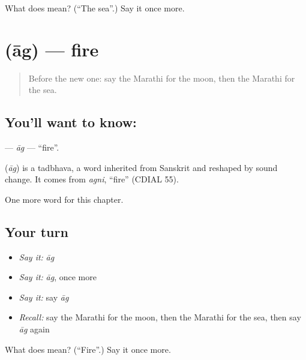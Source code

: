 \begin{tcolorbox}[breakable,colback=teal!4,colframe=teal!35!black,title={Before you move on}]
What does  mean? (\textquotedblleft{}The sea\textquotedblright{}.) Say it once more.
\end{tcolorbox}
\section[\texorpdfstring{\mr{आग} (āg)}{आग (āg)}]{ (āg) — fire}

\label{lesson:MR-C98-ag}



\begin{quote}
Before the new one: say the Marathi for the moon, then the Marathi for the sea.
\end{quote}

\subsection*{You'll want to know: }
\textbf{} — \emph{āg} — \textquotedblleft{}fire\textquotedblright{}.

\begin{cousinweb}
\textbf{} (\emph{āg}) is a tadbhava, a word inherited from Sanskrit and reshaped by sound change. It comes from \emph{agni}, \textquotedblleft{}fire\textquotedblright{} (CDIAL 55).
\end{cousinweb}

\begin{grammarlens}[title={What you've built}]
One more word for this chapter.
\end{grammarlens}

\subsection*{Your turn}
\begin{itemize}
\raggedright
  \item \emph{Say it:} \emph{āg}
  \item \emph{Say it:} \emph{āg}, once more
  \item \emph{Say it:} say \emph{āg}
  \item \emph{Recall:} say the Marathi for the moon, then the Marathi for the sea, then say \emph{āg} again
\end{itemize}

\begin{tcolorbox}[breakable,colback=teal!4,colframe=teal!35!black,title={Before you move on}]
What does  mean? (\textquotedblleft{}Fire\textquotedblright{}.) Say it once more.
\end{tcolorbox}
